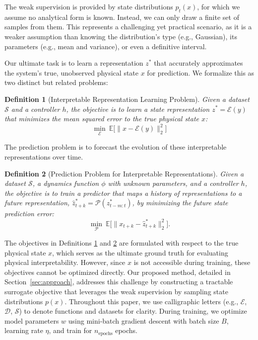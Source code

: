 \documentclass[sigconf]{acmart}
\newtheorem{definition}{Definition}
\begin{document}
The weak supervision is provided by state distributions \( p_t(x) \), for which we assume no analytical form is known. Instead, we can only draw a finite set of samples from them. This represents a challenging yet practical scenario, as it is a weaker assumption than knowing the distribution's type (e.g., Gaussian), its parameters (e.g., mean and variance), or even a definitive interval. 

Our ultimate task is to learn a representation \( z^* \) that accurately approximates the system’s true, unobserved physical state \( x \) for prediction. We formalize this as two distinct but related problems:

\begin{definition}[Interpretable Representation Learning Problem]
Given a dataset \( \mathcal{S} \) and a controller \( h \), the objective is to \emph{learn a state representation} \( z^* = \mathcal{E}(y) \) that minimizes the mean squared error to the true physical state \( x \):
\begin{equation}
\min_{\mathcal{E}} \ \mathbb{E} \big[ \| x - \mathcal{E}(y) \|_2^2 \big]
\end{equation}
\label{def:repprob}
\end{definition}

The prediction problem is to forecast the evolution of these interpretable representations over time.

\begin{definition}[Prediction Problem for Interpretable Representations]
Given a dataset \( \mathcal{S} \), a dynamics function \( \phi \) with unknown parameters, and a controller \( h \), the objective is to \emph{train a predictor} that maps a history of representations to a future representation, \( \hat{z}^*_{t+k} = \mathcal{P}(z^*_{t-m:t}) \), by minimizing the future state prediction error:
\begin{equation}
\min_{\mathcal{P}} \ \mathbb{E} \big[ \| x_{t+k} - \hat{z}^*_{t+k} \|_2^2 \big].
\end{equation}
\label{def:predprob}
\end{definition}

The objectives in Definitions \ref{def:repprob} and \ref{def:predprob} are formulated with respect to the true physical state \( x \), which serves as the ultimate ground truth for evaluating physical interpretability. However, since \( x \) is not accessible during training, these objectives cannot be optimized directly. Our proposed method, detailed in Section~\ref{sec:approach}, addresses this challenge by constructing a tractable surrogate objective that leverages the weak supervision by sampling state distributions \( p(x) \). Throughout this paper, we use calligraphic letters (e.g., $\mathcal{E}$, $\mathcal{D}$, $\mathcal{S}$) to denote functions and datasets for clarity. During training, we optimize model parameters $w$ using mini-batch gradient descent with batch size $B$, learning rate $\eta$, and train for $n_{\text{epochs}}$ epochs.
\end{document}

